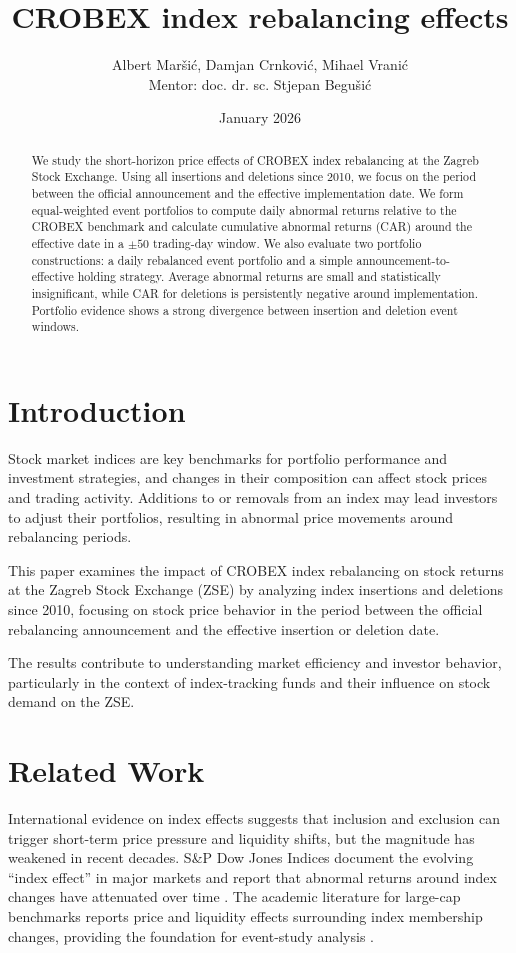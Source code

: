 \documentclass{article}
\title{CROBEX index rebalancing effects}
\author{Albert Maršić, Damjan Crnković, Mihael Vranić \\ 
        Mentor: doc. dr. sc. Stjepan Begušić}
\date{January 2026}
\begin{document}
\maketitle
\begin{abstract}
We study the short-horizon price effects of CROBEX index rebalancing at the Zagreb Stock Exchange. Using all insertions and deletions since 2010, we focus on the period between the official announcement and the effective implementation date. We form equal-weighted event portfolios to compute daily abnormal returns relative to the CROBEX benchmark and calculate cumulative abnormal returns (CAR) around the effective date in a \(\pm 50\) trading-day window. We also evaluate two portfolio constructions: a daily rebalanced event portfolio and a simple announcement-to-effective holding strategy. Average abnormal returns are small and statistically insignificant, while CAR for deletions is persistently negative around implementation. Portfolio evidence shows a strong divergence between insertion and deletion event windows.
\end{abstract}


\section{Introduction}
Stock market indices are key benchmarks for portfolio performance and investment strategies, and changes in their composition can affect stock prices and trading activity. Additions to or removals from an index may lead investors to adjust their portfolios, resulting in abnormal price movements around rebalancing periods.

This paper examines the impact of CROBEX index rebalancing on stock returns at the Zagreb Stock Exchange (ZSE) by analyzing index insertions and deletions since 2010, focusing on stock price behavior in the period between the official rebalancing announcement and the effective insertion or deletion date.

The results contribute to understanding market efficiency and investor behavior, particularly in the context of index-tracking funds and their influence on stock demand on the ZSE.

\section{Related Work}
International evidence on index effects suggests that inclusion and exclusion can trigger short-term price pressure and liquidity shifts, but the magnitude has weakened in recent decades. S\&P Dow Jones Indices document the evolving ``index effect'' in major markets and report that abnormal returns around index changes have attenuated over time \cite{spglobal-index-effect}. The academic literature for large-cap benchmarks reports price and liquidity effects surrounding index membership changes, providing the foundation for event-study analysis \cite{jof-2004-index}.
\end{document}
